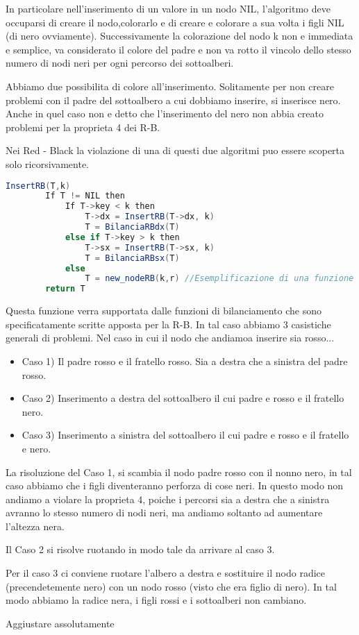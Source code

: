 In particolare nell'inserimento di un valore in un nodo NIL, l'algoritmo deve occuparsi di creare il nodo,colorarlo e di creare e colorare a sua volta i figli NIL (di nero ovviamente). Successivamente la colorazione del nodo k non e immediata e semplice, va considerato il colore del padre e non va rotto il vincolo dello stesso numero di nodi neri per ogni percorso dei sottoalberi.
 
Abbiamo due possibilita di colore all'inserimento. Solitamente per non creare problemi con il padre del sottoalbero a cui dobbiamo inserire, si inserisce nero. Anche in quel caso non e detto che l'inserimento del nero non abbia creato problemi per la proprieta 4 dei R-B.

Nei Red - Black la violazione di una di questi due algoritmi puo essere scoperta solo ricorsivamente.

\begin{lstlisting}[language=Java]
	InsertRB(T,k)
		If T != NIL then
			If T->key < k then
				T->dx = InsertRB(T->dx, k)
				T = BilanciaRBdx(T)
			else if T->key > k then
				T->sx = InsertRB(T->sx, k)
				T = BilanciaRBsx(T)
			else
				T = new_nodeRB(k,r) //Esemplificazione di una funzione che mette a NIL i figli, e colora
		return T
\end{lstlisting}

Questa funzione verra supportata dalle funzioni di bilanciamento che sono specificatamente scritte apposta per la R-B. In tal caso abbiamo 3 casistiche generali di problemi.
Nel caso in cui il nodo che andiamoa  inserire sia rosso...

\begin{itemize}
	\item Caso 1) Il padre rosso e il fratello rosso. Sia a destra che a sinistra del padre rosso.
	\item Caso 2) Inserimento a destra del sottoalbero il cui padre e rosso e il fratello nero.
	\item Caso 3) Inserimento a sinistra del sottoalbero il cui padre e rosso e il fratello e nero.
\end{itemize}

La risoluzione del Caso 1, si scambia il nodo padre rosso con il nonno nero, in tal caso abbiamo che i figli diventeranno perforza di cose neri. In questo modo non andiamo a violare la proprieta 4, poiche i percorsi sia a destra che a sinistra avranno lo stesso numero di nodi neri, ma andiamo soltanto ad aumentare l'altezza nera.

Il Caso 2 si risolve ruotando in modo tale da arrivare al caso 3.

Per il caso 3 ci conviene ruotare l'albero a destra e sostituire il nodo radice (precendetemente nero) con un nodo rosso (visto che era figlio di nero). In tal modo abbiamo la radice nera, i figli rossi e i sottoalberi non cambiano.

Aggiustare assolutamente